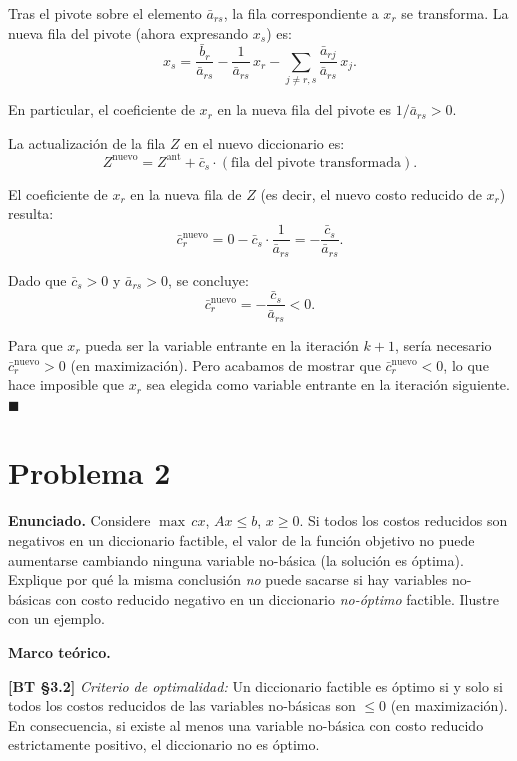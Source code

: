 \documentclass{article}
\newenvironment{marco}{\begin{mdframed}[linecolor=black!40,backgroundcolor=gray!5]\small\textbf{Marco teórico.}\par\smallskip}{\end{mdframed}\medskip}
\begin{document}
Tras el pivote sobre el elemento $\bar{a}_{rs}$, la fila correspondiente a $x_r$ se transforma. La nueva fila del pivote (ahora expresando $x_s$) es:
\[
  x_s = \frac{\bar{b}_r}{\bar{a}_{rs}} - \frac{1}{\bar{a}_{rs}}\,x_r - \sum_{j \neq r,s} \frac{\bar{a}_{rj}}{\bar{a}_{rs}}\,x_j.
\]

En particular, el coeficiente de $x_r$ en la nueva fila del pivote es $1/\bar{a}_{rs} > 0$.

La actualización de la fila $Z$ en el nuevo diccionario es:
\[
  Z^{\text{nuevo}} = Z^{\text{ant}} + \bar{c}_s \cdot (\text{fila del pivote transformada}).
\]

El coeficiente de $x_r$ en la nueva fila de $Z$ (es decir, el nuevo costo reducido de $x_r$) resulta:
\[
  \bar{c}_r^{\text{nuevo}} = 0 - \bar{c}_s \cdot \frac{1}{\bar{a}_{rs}} = -\frac{\bar{c}_s}{\bar{a}_{rs}}.
\]

Dado que $\bar{c}_s > 0$ y $\bar{a}_{rs} > 0$, se concluye:
\[
  \bar{c}_r^{\text{nuevo}} = -\frac{\bar{c}_s}{\bar{a}_{rs}} < 0.
\]

Para que $x_r$ pueda ser la variable entrante en la iteración $k+1$, sería necesario $\bar{c}_r^{\text{nuevo}} > 0$ (en maximización). Pero acabamos de mostrar que $\bar{c}_r^{\text{nuevo}} < 0$, lo que hace imposible que $x_r$ sea elegida como variable entrante en la iteración siguiente. $\blacksquare$

\section*{Problema 2}

\textbf{Enunciado.} Considere $\max\, cx$, $Ax \leq b$, $x \geq 0$. Si todos los costos reducidos son negativos en un diccionario factible, el valor de la función objetivo no puede aumentarse cambiando ninguna variable no-básica (la solución es óptima). Explique por qué la misma conclusión \emph{no} puede sacarse si hay variables no-básicas con costo reducido negativo en un diccionario \emph{no-óptimo} factible. Ilustre con un ejemplo.

\begin{marco}
\textbf{[BT §3.2]} \emph{Criterio de optimalidad:} Un diccionario factible es óptimo si y solo si todos los costos reducidos de las variables no-básicas son $\leq 0$ (en maximización). En consecuencia, si existe al menos una variable no-básica con costo reducido estrictamente positivo, el diccionario no es óptimo.
\end{marco}
\end{document}
